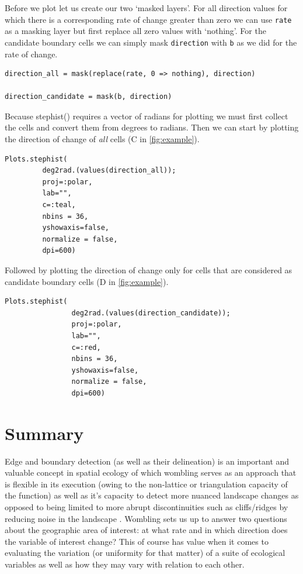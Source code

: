 Before we plot let us create our two `masked layers'. For all direction
values for which there is a corresponding rate of change greater than
zero we can use \texttt{rate} as a masking layer but first replace all
zero values with `nothing'. For the candidate boundary cells we can
simply mask \texttt{direction} with \texttt{b} as we did for the rate of
change.

\begin{verbatim}
direction_all = mask(replace(rate, 0 => nothing), direction)

direction_candidate = mask(b, direction)
\end{verbatim}

Because stephist() requires a vector of radians for plotting we must
first collect the cells and convert them from degrees to radians. Then
we can start by plotting the direction of change of \emph{all} cells (C
in \autoref{fig:example}).

\begin{verbatim}
Plots.stephist(
         deg2rad.(values(direction_all));
         proj=:polar,
         lab="",
         c=:teal,
         nbins = 36,
         yshowaxis=false,
         normalize = false,
         dpi=600)
\end{verbatim}

Followed by plotting the direction of change only for cells that are
considered as candidate boundary cells (D in \autoref{fig:example}).

\begin{verbatim}
Plots.stephist(
                deg2rad.(values(direction_candidate));
                proj=:polar,
                lab="",
                c=:red,
                nbins = 36,
                yshowaxis=false,
                normalize = false,
                dpi=600)
\end{verbatim}

\section{Summary}\label{summary}

Edge and boundary detection (as well as their delineation) is an
important and valuable concept in spatial ecology
\cite{Cadenasso2003FraThe} of which wombling serves as an approach that
is flexible in its execution (owing to the non-lattice or triangulation
capacity of the function) \cite{Fortin2005SpaAna, Fortin1994EdgDet} as
well as it's capacity to detect more nuanced landscape changes as
opposed to being limited to more abrupt discontinuities such as
cliffs/ridges by reducing noise in the landscape
\cite{Matchev2020FinWom}. Wombling sets us up to answer two questions
about the geographic area of interest: at what rate and in which
direction does the variable of interest change? This of course has value
when it comes to evaluating the variation (or uniformity for that
matter) of a suite of ecological variables as well as how they may vary
with relation to each other.

